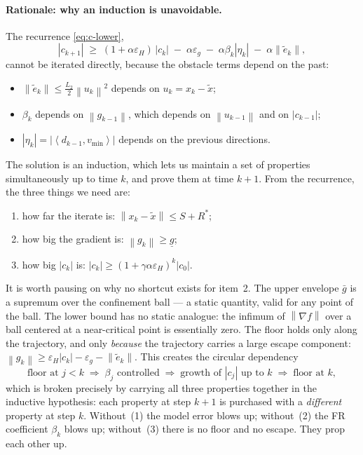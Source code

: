 \documentclass[11pt,a4paper]{article}
\theoremstyle{plain}
\theoremstyle{definition}
\newcommand{\norm}[1]{\left\|#1\right\|}
\newcommand{\inner}[2]{\left\langle #1,#2 \right\rangle}
\newcommand{\eps}{\varepsilon}
\newcommand{\epsg}{\eps_{g}}
\newcommand{\epsH}{\eps_{H}}
\newcommand{\grad}{\nabla}
\newcommand{\Ltwo}{L_{2}}
\newcommand{\snap}{\tilde{x}}
\newcommand{\vmin}{v_{\min}}
\newcommand{\glow}{\underline{g}}
\newcommand{\Rstar}{R^{*}}
\newcommand{\gup}{\bar g}
\begin{document}
\paragraph{Rationale: why an induction is unavoidable.}
The recurrence \eqref{eq:c-lower},
\[
|c_{k+1}| \;\ge\; (1+\alpha\epsH)\,|c_k| \;-\; \alpha\epsg
\;-\;\alpha\beta_{k}|\eta_{k}|\;-\;\alpha\norm{\tilde e_{k}},
\]
cannot be iterated directly, because the obstacle terms depend on the past:
\begin{itemize}[leftmargin=*]
\item $\norm{\tilde e_{k}} \le \tfrac{\Ltwo}{2}\norm{u_{k}}^{2}$ depends on
$u_{k} = x_{k}-\snap$;
\item $\beta_{k}$ depends on $\norm{g_{k-1}}$, which depends on
$\norm{u_{k-1}}$ and on $|c_{k-1}|$;
\item $|\eta_{k}| = |\inner{d_{k-1}}{\vmin}|$ depends on the previous
directions.
\end{itemize}
The solution is an induction, which lets us maintain a set of properties
simultaneously up to time $k$, and prove them at time $k+1$. From the
recurrence, the three things we need are:
\begin{enumerate}
\item how far the iterate is: $\norm{x_{k}-\snap}\le S+\Rstar$;
\item how big the gradient is: $\norm{g_{k}}\ge\glow$;
\item how big $|c_{k}|$ is: $|c_{k}|\ge(1+\gamma\alpha\epsH)^{k}|c_{0}|$.
\end{enumerate}
It is worth pausing on why no shortcut exists for item~2. The upper envelope
$\gup$ is a supremum over the confinement ball --- a static quantity, valid for
any point of the ball. The lower bound has no static analogue: the infimum of
$\norm{\grad f}$ over a ball centered at a near-critical point is essentially
zero. The floor holds only along the trajectory, and only \emph{because} the
trajectory carries a large escape component:
$\norm{g_{k}}\ge\epsH|c_{k}|-\epsg-\norm{\tilde e_{k}}$. This creates the
circular dependency
\[
\text{floor at } j<k
\;\Longrightarrow\; \beta_{j}\text{ controlled}
\;\Longrightarrow\; \text{growth of } |c_{j}| \text{ up to } k
\;\Longrightarrow\; \text{floor at } k,
\]
which is broken precisely by carrying all three properties together in the
inductive hypothesis: each property at step $k+1$ is purchased with a
\emph{different} property at step $k$. Without~(1) the model error blows up;
without~(2) the FR coefficient $\beta_{k}$ blows up; without~(3) there is no
floor and no escape. They prop each other up.
\end{document}
